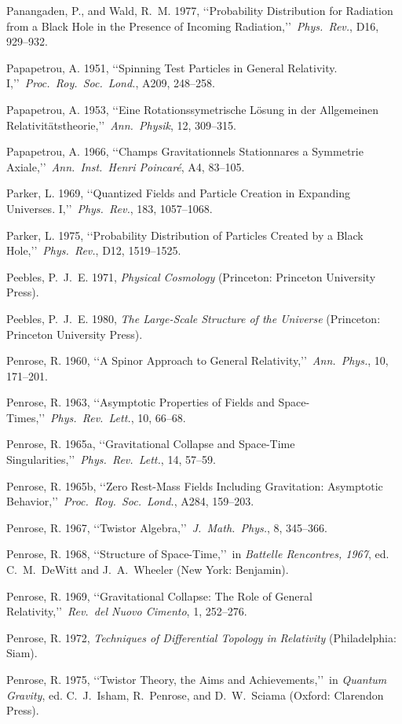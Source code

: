 \item Panangaden, P., and Wald, R.~M. 1977, \lq\lq Probability Distribution for Radiation from a Black Hole in the Presence of Incoming Radiation,\rq\rq\ \emph{Phys.\ Rev.}, D16, 929--932.
\item Papapetrou, A. 1951, \lq\lq Spinning Test Particles in General Relativity. I,\rq\rq\ \emph{Proc.\ Roy.\ Soc.\ Lond.}, A209, 248--258.
\item Papapetrou, A. 1953, \lq\lq Eine Rotationssymetrische L{\"o}sung in der Allgemeinen Relativit{\"a}tstheorie,\rq\rq\ \emph{Ann.\ Physik}, 12, 309--315.
\item Papapetrou, A. 1966, \lq\lq Champs Gravitationnels Stationnares a Symmetrie Axiale,\rq\rq\ \emph{Ann.\ Inst.\ Henri Poincar\'e}, A4, 83--105.
\item Parker, L. 1969, \lq\lq Quantized Fields and Particle Creation in Expanding Universes. I,\rq\rq\ \emph{Phys.\ Rev.}, 183, 1057--1068.
\item Parker, L. 1975, \lq\lq Probability Distribution of Particles Created by a Black Hole,\rq\rq\ \emph{Phys.\ Rev.}, D12, 1519--1525.
\item Peebles, P.~J.~E. 1971, \emph{Physical Cosmology} (Princeton: Princeton University Press).
\item Peebles, P.~J.~E. 1980, \emph{The Large-Scale Structure of the Universe} (Princeton: Princeton University Press).
\item Penrose, R. 1960, \lq\lq A Spinor Approach to General Relativity,\rq\rq\ \emph{Ann.\ Phys.}, 10, 171--201.
\item Penrose, R. 1963, \lq\lq Asymptotic Properties of Fields and Space-Times,\rq\rq\ \emph{Phys.\ Rev.\ Lett.}, 10, 66--68.
\item Penrose, R. 1965a, \lq\lq Gravitational Collapse and Space-Time Singularities,\rq\rq\ \emph{Phys.\ Rev.\ Lett.}, 14, 57--59.
\item Penrose, R. 1965b, \lq\lq Zero Rest-Mass Fields Including Gravitation: Asymptotic Behavior,\rq\rq\ \emph{Proc.\ Roy.\ Soc.\ Lond.}, A284, 159--203.
\item Penrose, R. 1967, \lq\lq Twistor Algebra,\rq\rq\ \emph{J.\ Math.\ Phys.}, 8, 345--366.
\item Penrose, R. 1968, \lq\lq Structure of Space-Time,\rq\rq\ in \emph{Battelle Rencontres, 1967}, ed. C.~M.~DeWitt and J.~A.~Wheeler (New York: Benjamin).
\item Penrose, R. 1969, \lq\lq Gravitational Collapse: The Role of General Relativity,\rq\rq\ \emph{Rev.\ del Nuovo Cimento}, 1, 252--276.
\item Penrose, R. 1972, \emph{Techniques of Differential Topology in Relativity} (Philadelphia: Siam).
\item Penrose, R. 1975, \lq\lq Twistor Theory, the Aims and Achievements,\rq\rq\ in \emph{Quantum Gravity}, ed. C.~J.~Isham, R.~Penrose, and D.~W.~Sciama (Oxford: Clarendon Press).

